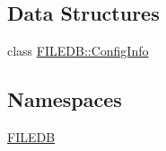 \subsection*{Data Structures}
\begin{DoxyCompactItemize}
\item 
class \mbox{\hyperlink{classFILEDB_1_1ConfigInfo}{F\+I\+L\+E\+D\+B\+::\+Config\+Info}}
\end{DoxyCompactItemize}
\subsection*{Namespaces}
\begin{DoxyCompactItemize}
\item 
 \mbox{\hyperlink{namespaceFILEDB}{F\+I\+L\+E\+DB}}
\end{DoxyCompactItemize}
